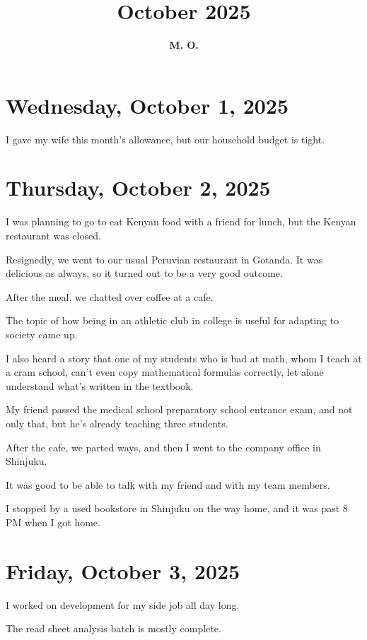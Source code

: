\documentclass[uplatex]{jsarticle}
\title{
\textbf{October 2025}
}
\author{
\textbf{M. O.}
}
\begin{document}
\maketitle

\section{Wednesday, October 1, 2025}

I gave my wife this month's allowance, but our household budget is tight.



\section{Thursday, October 2, 2025}

I was planning to go to eat Kenyan food with a friend for lunch, but the Kenyan restaurant was closed.

Resignedly, we went to our usual Peruvian restaurant in Gotanda. It was delicious as always, so it turned out to be a very good outcome.

After the meal, we chatted over coffee at a cafe.

The topic of how being in an athletic club in college is useful for adapting to society came up.

I also heard a story that one of my students who is bad at math, whom I teach at a cram school, can't even copy mathematical formulas correctly, let alone understand what's written in the textbook.

My friend passed the medical school preparatory school entrance exam, and not only that, but he's already teaching three students.

After the cafe, we parted ways, and then I went to the company office in Shinjuku.

It was good to be able to talk with my friend and with my team members.

I stopped by a used bookstore in Shinjuku on the way home, and it was past 8 PM when I got home.



\section{Friday, October 3, 2025}

I worked on development for my side job all day long.

The read sheet analysis batch is mostly complete.
\end{document}
